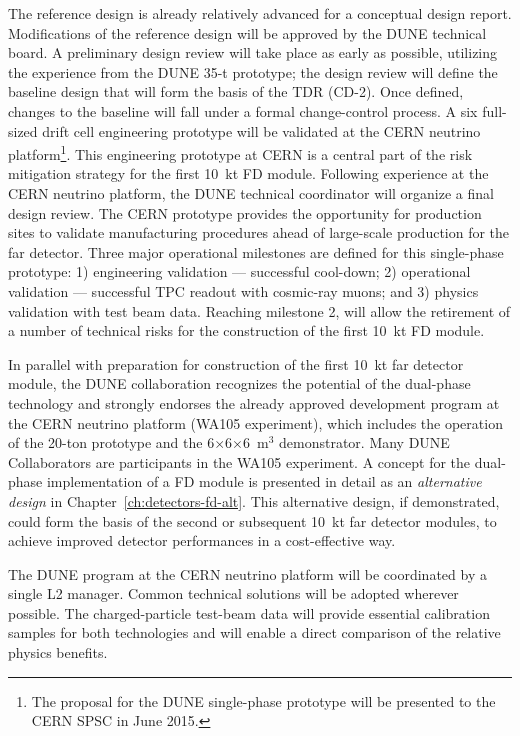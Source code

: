 The reference design is already relatively advanced for a
conceptual design report. Modifications of the reference design will
be approved by the DUNE technical board. A preliminary design
review will take place as early as possible, utilizing the experience
from the DUNE 35-t prototype; the design review will define the
baseline design that will form the basis of the TDR (CD-2).  Once
defined, changes to the baseline will fall under a formal
change-control process. A six full-sized drift cell
engineering prototype will be validated at the CERN neutrino
platform\footnote{The proposal for the DUNE single-phase prototype
  will be presented to the CERN SPSC in June 2015.}.  This engineering
prototype at CERN is a central part of the risk mitigation strategy
for the first 10~kt FD module. Following experience at the CERN
neutrino platform, the DUNE technical coordinator will organize a
final design review. The CERN prototype provides the opportunity for
production sites to validate manufacturing procedures ahead of
large-scale production for the far detector. Three major operational
milestones are defined for this single-phase prototype: 1) engineering
validation --- successful cool-down; 2) operational validation ---
successful TPC readout with cosmic-ray muons; and 3) physics
validation with test beam data. Reaching milestone 2, will allow the
retirement of a number of technical risks for the construction of the
first 10~kt FD module.

In parallel with preparation for construction of the first 10~kt far
detector module, the DUNE collaboration recognizes the potential of
the dual-phase technology and strongly endorses the already approved
development program at the CERN neutrino platform (WA105 experiment),
which includes the operation of the 20-ton prototype and the
6$\times$6$\times$6~m$^3$ demonstrator. Many DUNE Collaborators are
participants in the WA105 experiment. A concept for the dual-phase
implementation of a FD module is presented in detail as an
\textit{alternative design} in Chapter~\ref{ch:detectors-fd-alt}. This
alternative design, if demonstrated, could form the basis of the
second or subsequent 10~kt far detector modules, to achieve improved
detector performances in a cost-effective way.

The DUNE program at the CERN neutrino platform will be coordinated by
a single L2 manager. Common technical solutions will be adopted
wherever possible.  The charged-particle test-beam data will provide
essential calibration samples for both technologies and will enable a
direct comparison of the relative physics benefits.

